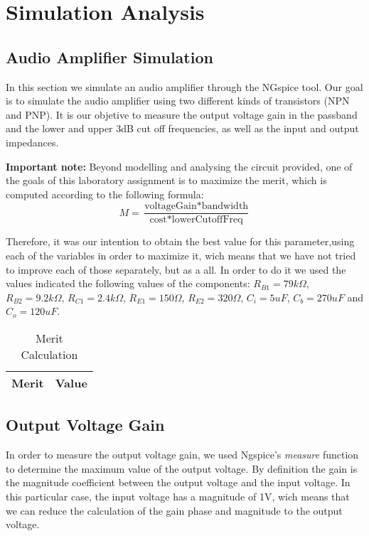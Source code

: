 \section{Simulation Analysis}
\label{sec:simulation}

\subsection{Audio Amplifier Simulation}
\label{subsec:amp_simulation}
\par In this section we simulate an audio amplifier through the NGspice tool. Our goal is to simulate the audio amplifier using two different kinds of transistors (NPN and PNP). It is our objetive to measure the output voltage gain in the passband and the lower and upper 3dB cut off frequencies, as well as the input and output impedances.

\par  \textbf{Important note:} Beyond modelling and analysing the circuit provided, one of the goals of this laboratory assignment is to maximize the merit, which is computed according to the following formula:
\begin{equation}
M = \frac{\text{voltageGain}*\text{bandwidth}}{\text{cost}*\text{lowerCutoffFreq}}
\end{equation}

Therefore, it was our intention to obtain the best value for this parameter,using each of the variables in order to maximize it, wich means that we have not tried to improve each of those separately, but as a all.
In order to do it we used the values indicated the following values of the components: $R_{B1}=79k\Omega$, $R_{B2}=9.2k\Omega$, $R_{C1}=2.4k\Omega$, $R_{E1}=150\Omega$, $R_{E2}=320\Omega$, $C_{i}=5uF$, $C_{b}=270uF$ and $C_{o}=120uF$.   
  

\begin{table}[H]
  \centering
  \begin{tabular}{ | m{11cm} | m{3cm}| } 
    \hline    
    {\bf Merit} & {\bf Value} \\ \hline
    
  \end{tabular}
  \caption{Merit Calculation}
  \label{tab:merit}
\end{table}

\subsection{Output Voltage Gain}
\label{output_gain}
\par In order to measure the output voltage gain, we used Ngspice's \textit{measure} function to determine the maximum value of the output voltage. By definition the gain is the magnitude coefficient between the output voltage and the input voltage. In this particular case, the input voltage has a magnitude of 1V, wich means that we can reduce the calculation of the gain phase and magnitude to the output voltage.

